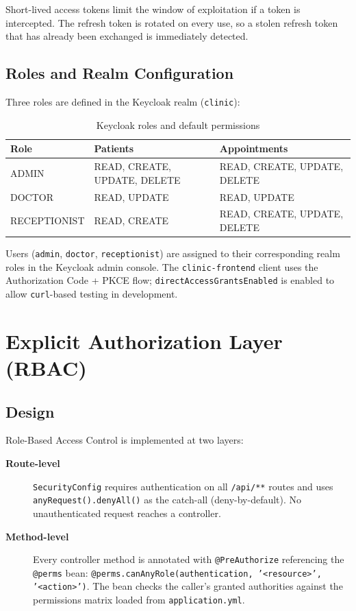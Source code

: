 \documentclass[12pt,a4paper]{report}
\begin{document}
Short-lived access tokens limit the window of exploitation if a token is intercepted.
The refresh token is rotated on every use, so a stolen refresh token that has already
been exchanged is immediately detected.

\subsection{Roles and Realm Configuration}

Three roles are defined in the Keycloak realm (\texttt{clinic}):

\begin{table}[H]
\centering
\caption{Keycloak roles and default permissions}
\begin{tabularx}{\linewidth}{l X X}
\toprule
\textbf{Role}       & \textbf{Patients}              & \textbf{Appointments} \\
\midrule
ADMIN               & READ, CREATE, UPDATE, DELETE   & READ, CREATE, UPDATE, DELETE \\
DOCTOR              & READ, UPDATE                   & READ, UPDATE \\
RECEPTIONIST        & READ, CREATE                   & READ, CREATE, UPDATE, DELETE \\
\bottomrule
\end{tabularx}
\end{table}

Users (\texttt{admin}, \texttt{doctor}, \texttt{receptionist}) are assigned to their
corresponding realm roles in the Keycloak admin console. The \texttt{clinic-frontend} client
uses the Authorization Code + PKCE flow; \texttt{directAccessGrantsEnabled} is enabled to
allow \texttt{curl}-based testing in development.

\section{Explicit Authorization Layer (RBAC)}

\subsection{Design}

Role-Based Access Control is implemented at two layers:

\begin{description}
  \item[\textbf{Route-level}] \texttt{SecurityConfig} requires authentication on all
    \texttt{/api/**} routes and uses \texttt{anyRequest().denyAll()} as the catch-all
    (deny-by-default). No unauthenticated request reaches a controller.
  \item[\textbf{Method-level}] Every controller method is annotated with
    \texttt{@PreAuthorize} referencing the \texttt{@perms} bean:
    \texttt{@perms.canAnyRole(authentication,\allowbreak{} '<resource>',\allowbreak{} '<action>')}.
    The bean checks the caller's granted authorities against the permissions matrix
    loaded from \texttt{application.yml}.
\end{description}
\end{document}
